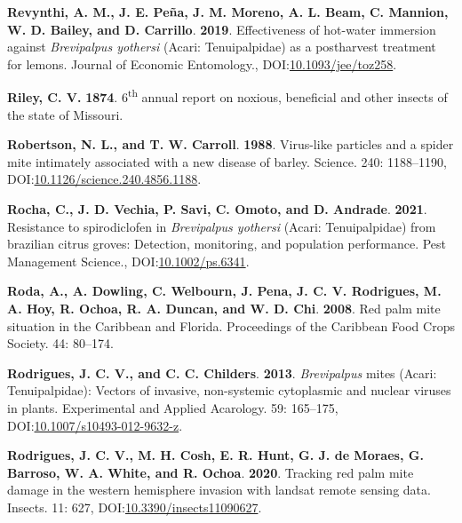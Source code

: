 \documentclass[12pt,final,CPage]{ufthesis}
\newlength{\cslhangindent}
\newenvironment{CSLReferences}[2] %
{%
	\setlength{\parindent}{0pt}
	\ifodd #1 \everypar{\setlength{\hangindent}{\cslhangindent}}\ignorespaces\fi
	\ifnum #2 > 0
	\setlength{\parskip}{#2\baselineskip}
	\fi
}%
{}
\begin{document}
{\begin{CSLReferences}{1}{0}
  \leavevmode{}%
  \textbf{Revynthi, A. M., J. E. Peña, J. M. Moreno, A. L. Beam, C. Mannion, W. D. Bailey, and D. Carrillo}. \textbf{2019}. Effectiveness of hot-water immersion against {\emph{Brevipalpus yothersi}} ({Acari}: {Tenuipalpidae}) as a postharvest treatment for lemons. Journal of Economic Entomology., DOI:\href{https://doi.org/10.1093/jee/toz258}{10.1093/jee/toz258}.

  \leavevmode{}%
  \textbf{Riley, C. V.} \textbf{1874}. 6\textsuperscript{th} annual report on noxious, beneficial and other insects of the state of {Missouri}.

  \leavevmode{}%
  \textbf{Robertson, N. L., and T. W. Carroll}. \textbf{1988}. Virus-like particles and a spider mite intimately associated with a new disease of barley. Science. 240: 1188--1190, DOI:\href{https://doi.org/10.1126/science.240.4856.1188}{10.1126/science.240.4856.1188}.

  \leavevmode{}%
  \textbf{Rocha, C., J. D. Vechia, P. Savi, C. Omoto, and D. Andrade}. \textbf{2021}. Resistance to spirodiclofen in {\emph{Brevipalpus yothersi}} ({Acari}: {Tenuipalpidae}) from brazilian citrus groves: Detection, monitoring, and population performance. Pest Management Science., DOI:\href{https://doi.org/10.1002/ps.6341}{10.1002/ps.6341}.

  \leavevmode{}%
  \textbf{Roda, A., A. Dowling, C. Welbourn, J. Pena, J. C. V. Rodrigues, M. A. Hoy, R. Ochoa, R. A. Duncan, and W. D. Chi}. \textbf{2008}. Red palm mite situation in the {Caribbean} and {Florida}. Proceedings of the Caribbean Food Crops Society. 44: 80--174.

  \leavevmode{}%
  \textbf{Rodrigues, J. C. V., and C. C. Childers}. \textbf{2013}. {\emph{Brevipalpus}} mites ({Acari}: {Tenuipalpidae}): Vectors of invasive, non-systemic cytoplasmic and nuclear viruses in plants. Experimental and Applied Acarology. 59: 165--175, DOI:\href{https://doi.org/10.1007/s10493-012-9632-z}{10.1007/s10493-012-9632-z}.

  \leavevmode{}%
  \textbf{Rodrigues, J. C. V., M. H. Cosh, E. R. Hunt, G. J. de Moraes, G. Barroso, W. A. White, and R. Ochoa}. \textbf{2020}. Tracking red palm mite damage in the western hemisphere invasion with landsat remote sensing data. Insects. 11: 627, DOI:\href{https://doi.org/10.3390/insects11090627}{10.3390/insects11090627}.


\end{CSLReferences}}
\end{document}
